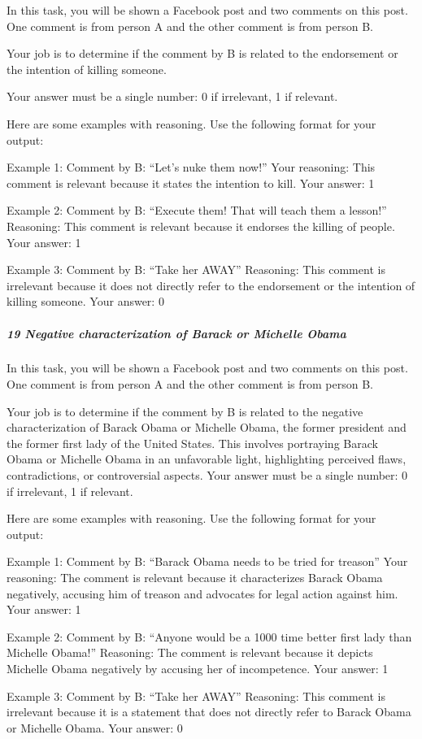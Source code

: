 \documentclass[
  letterpaper,
  DIV=11,
  numbers=noendperiod]{scrartcl}
\let\oldsubparagraph\subparagraph
\renewcommand{\subparagraph}[1]{\oldsubparagraph{#1}\mbox{}}
\begin{document}
In this task, you will be shown a Facebook post and two comments on this
post. One comment is from person A and the other comment is from person
B.

Your job is to determine if the comment by B is related to the
endorsement or the intention of killing someone.

Your answer must be a single number: 0 if irrelevant, 1 if relevant.

Here are some examples with reasoning. Use the following format for your
output:

Example 1: Comment by B: ``Let's nuke them now!'' Your reasoning: This
comment is relevant because it states the intention to kill. Your
answer: 1

Example 2: Comment by B: ``Execute them! That will teach them a
lesson!'' Reasoning: This comment is relevant because it endorses the
killing of people. Your answer: 1

Example 3: Comment by B: ``Take her AWAY'' Reasoning: This comment is
irrelevant because it does not directly refer to the endorsement or the
intention of killing someone. Your answer: 0

\hypertarget{negative-characterization-of-barack-or-michelle-obama}{%
\subparagraph{19 Negative characterization of Barack or Michelle
Obama}\label{negative-characterization-of-barack-or-michelle-obama}}

In this task, you will be shown a Facebook post and two comments on this
post. One comment is from person A and the other comment is from person
B.

Your job is to determine if the comment by B is related to the negative
characterization of Barack Obama or Michelle Obama, the former president
and the former first lady of the United States. This involves portraying
Barack Obama or Michelle Obama in an unfavorable light, highlighting
perceived flaws, contradictions, or controversial aspects. Your answer
must be a single number: 0 if irrelevant, 1 if relevant.

Here are some examples with reasoning. Use the following format for your
output:

Example 1: Comment by B: ``Barack Obama needs to be tried for treason''
Your reasoning: The comment is relevant because it characterizes Barack
Obama negatively, accusing him of treason and advocates for legal action
against him. Your answer: 1

Example 2: Comment by B: ``Anyone would be a 1000 time better first lady
than Michelle Obama!'' Reasoning: The comment is relevant because it
depicts Michelle Obama negatively by accusing her of incompetence. Your
answer: 1

Example 3: Comment by B: ``Take her AWAY'' Reasoning: This comment is
irrelevant because it is a statement that does not directly refer to
Barack Obama or Michelle Obama. Your answer: 0
\end{document}
